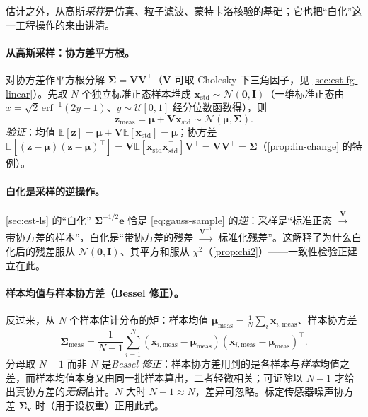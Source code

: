 估计之外，从高斯\emph{采样}是仿真、粒子滤波、蒙特卡洛核验的基础；它也把“白化”这一工程操作的来由讲清。

\paragraph{从高斯采样：协方差平方根。}
对协方差作平方根分解 $\boldsymbol{\Sigma}=\mathbf{V}\mathbf{V}^\top$（$\mathbf{V}$ 可取 Cholesky 下三角因子，见 \cref{sec:est-fg-linear}）。先取 $N$ 个独立标准正态样本堆成 $\mathbf{x}_{\text{std}}\sim\mathcal{N}(\mathbf{0},\mathbf{I})$（一维标准正态由 $x=\sqrt{2}\,\mathrm{erf}^{-1}(2y-1)$、$y\sim\mathcal{U}[0,1]$ 经分位数函数得），则
\begin{equation}
  \mathbf{z}_{\text{meas}}=\boldsymbol{\mu}+\mathbf{V}\mathbf{x}_{\text{std}}\sim\mathcal{N}(\boldsymbol{\mu},\boldsymbol{\Sigma}).
  \label{eq:gauss-sample}
\end{equation}
\emph{验证}：均值 $\mathbb{E}[\mathbf{z}]=\boldsymbol{\mu}+\mathbf{V}\mathbb{E}[\mathbf{x}_{\text{std}}]=\boldsymbol{\mu}$；协方差 $\mathbb{E}[(\mathbf{z}-\boldsymbol{\mu})(\mathbf{z}-\boldsymbol{\mu})^\top]=\mathbf{V}\mathbb{E}[\mathbf{x}_{\text{std}}\mathbf{x}_{\text{std}}^\top]\mathbf{V}^\top=\mathbf{V}\mathbf{V}^\top=\boldsymbol{\Sigma}$（\cref{prop:lin-change} 的特例）。

\paragraph{白化是采样的逆操作。}
\cref{sec:est-ls} 的“白化” $\boldsymbol{\Sigma}^{-1/2}\mathbf{e}$ 恰是 \cref{eq:gauss-sample} 的\emph{逆}：采样是“标准正态 $\xrightarrow{\mathbf{V}}$ 带协方差的样本”，白化是“带协方差的残差 $\xrightarrow{\mathbf{V}^{-1}}$ 标准化残差”。这解释了为什么白化后的残差服从 $\mathcal{N}(\mathbf{0},\mathbf{I})$、其平方和服从 $\chi^2$（\cref{prop:chi2}）——一致性检验正建立在此。

\paragraph{样本均值与样本协方差（Bessel 修正）。}
反过来，从 $N$ 个样本估计分布的矩：样本均值 $\boldsymbol{\mu}_{\text{meas}}=\tfrac1N\sum_i\mathbf{x}_{i,\text{meas}}$、样本协方差
\begin{equation}
  \boldsymbol{\Sigma}_{\text{meas}}=\frac{1}{N-1}\sum_{i=1}^{N}(\mathbf{x}_{i,\text{meas}}-\boldsymbol{\mu}_{\text{meas}})(\mathbf{x}_{i,\text{meas}}-\boldsymbol{\mu}_{\text{meas}})^\top.
  \label{eq:sample-cov}
\end{equation}
分母取 $N-1$ 而非 $N$ 是\emph{Bessel 修正}：样本协方差用到的是各样本与\emph{样本}均值之差，而样本均值本身又由同一批样本算出，二者轻微相关；可证除以 $N-1$ 才给出真协方差的\emph{无偏}估计。$N$ 大时 $N-1\approx N$，差异可忽略。标定传感器噪声协方差 $\boldsymbol{\Sigma}_{\mathbf{v}}$ 时（用于设权重）正用此式。

